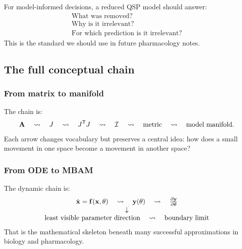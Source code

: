 For model-informed decisions, a reduced QSP model should answer:
\[
  \begin{array}{c}
    \text{What was removed?}\\
    \text{Why is it irrelevant?}\\
    \text{For which prediction is it irrelevant?}
  \end{array}
\]
This is the standard we should use in future pharmacology notes.

\subsection{The full conceptual chain}

\subsubsection*{From matrix to manifold}

The chain is:
\[
  \mathbf{A}
  \quad\leadsto\quad
  J
  \quad\leadsto\quad
  J^{\mathsf{T}}J
  \quad\leadsto\quad
  \mathcal{I}
  \quad\leadsto\quad
  \text{metric}
  \quad\leadsto\quad
  \text{model manifold}.
\]
Each arrow changes vocabulary but preserves a central idea: how does a small movement in one space become a movement in another space?

\subsubsection*{From ODE to MBAM}

The dynamic chain is:
\[
  \begin{array}{c}
    \dot{\mathbf{x}}=\mathbf{f}(\mathbf{x},\theta)
    \quad\leadsto\quad
    \mathbf{y}(\theta)
    \quad\leadsto\quad
    \frac{\partial \mathbf{y}}{\partial \theta}\\
    \downarrow\\
    \text{least visible parameter direction}
    \quad\leadsto\quad
    \text{boundary limit}
  \end{array}
\]
That is the mathematical skeleton beneath many successful approximations in biology and pharmacology.
